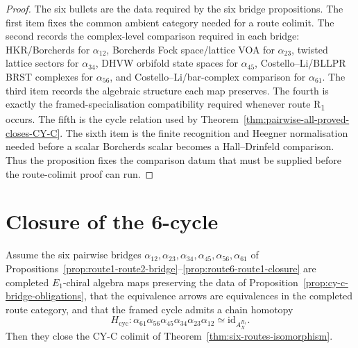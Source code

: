\begin{proof}
The six bullets are the data required by the six bridge propositions.
The first item fixes the common ambient category needed for a route
colimit. The second records the complex-level comparison required in each bridge:
HKR/Borcherds for $\alpha_{12}$, Borcherds Fock space/lattice VOA for
$\alpha_{23}$, twisted lattice sectors for $\alpha_{34}$, DHVW orbifold
state spaces for $\alpha_{45}$, Costello--Li/BLLPR BRST complexes for
$\alpha_{56}$, and Costello--Li/bar-complex comparison for
$\alpha_{61}$. The third item records the algebraic structure each
map preserves. The fourth is exactly the framed-specialisation
compatibility required whenever route R\textsubscript{1} occurs. The
fifth is the cycle relation used by
Theorem~\ref{thm:pairwise-all-proved-closes-CY-C}. The sixth item is the
finite recognition and Heegner normalisation needed before a scalar
Borcherds scalar becomes a Hall--Drinfeld comparison. Thus the
proposition fixes the comparison datum that must be supplied before the
route-colimit proof can run.
\end{proof}

\section{Closure of the 6-cycle}
\label{sec:cy-c-cycle-closure}

\begin{theorem}
\label{thm:pairwise-all-proved-closes-CY-C}
Assume the six pairwise bridges $\alpha_{12}, \alpha_{23}, \alpha_{34},
\alpha_{45}, \alpha_{56}, \alpha_{61}$ of
Propositions~\ref{prop:route1-route2-bridge}--\ref{prop:route6-route1-closure}
are completed $E_1$-chiral algebra maps preserving the data of
Proposition~\ref{prop:cy-c-bridge-obligations}, that the equivalence
arrows are equivalences in the completed route category, and that the
framed cycle admits a chain homotopy
\[
 H_{\mathrm{cyc}}\colon
 \alpha_{61}\alpha_{56}\alpha_{45}\alpha_{34}\alpha_{23}\alpha_{12}
 \simeq \mathrm{id}_{A_X^{R_1}}.
\]
Then they close the CY-C colimit of
Theorem~\ref{thm:six-routes-isomorphism}.
\end{theorem}

